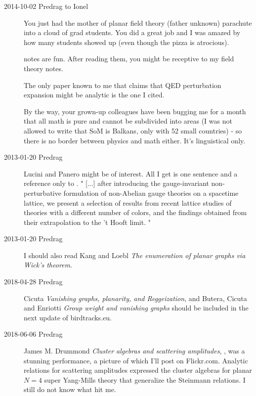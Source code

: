 \begin{description}
\item[2014-10-02 Predrag to Ionel]
 You just had the mother of planar field theory (father unknown)
 parachute into a cloud of grad students. You did a great job and I was
 amazed by how many students showed up (even though the pizza is
 atrocious).

 notes are fun. After reading them, you might be receptive to my
 {field theory notes}.

The only paper known to me that claims that QED perturbation expansion
might be analytic is the one I cited.

By the way, your grown-up colleagues have been bugging me for a month
that all math is pure and cannot be subdivided into areas (I was not
allowed to write that SoM is Balkans, only with 52 small countries) - so
there is no border between physics and math either. It's linguistical
only.

\item[2013-01-20 Predrag]
Lucini and Panero 
might be of interest. All I get is one sentence and a reference only
to .
"
[...] 
after introducing the gauge-invariant non-perturbative formulation of 
non-Abelian gauge theories on a spacetime lattice, we present a selection 
of results from recent lattice studies of theories with a different 
number of colors, and the findings obtained from their extrapolation to 
the 't Hooft limit. 
"

\item[2013-01-20 Predrag]
I should also read Kang and Loebl
{\em The enumeration of planar graphs via {Wick}'s theorem}.

\item[2018-04-28 Predrag]
Cicuta {\em Vanishing graphs, planarity, and {Reggeization}},
and
Butera, Cicuta and Enriotti {\em Group weight and vanishing graphs}
should be included in the next update of birdtracks.eu.

\item[2018-06-06 Predrag]

{James M. Drummond} {\em Cluster algebras and scattering amplitudes},
, was a stunning performance, a picture of which I'll
post on Flickr.com. Analytic relations for scattering amplitudes
expressed the cluster algebras for planar $N=4$ super Yang-Mills theory
that generalize the Steinmann relations.  I still do not know what hit
me.


\end{description}
